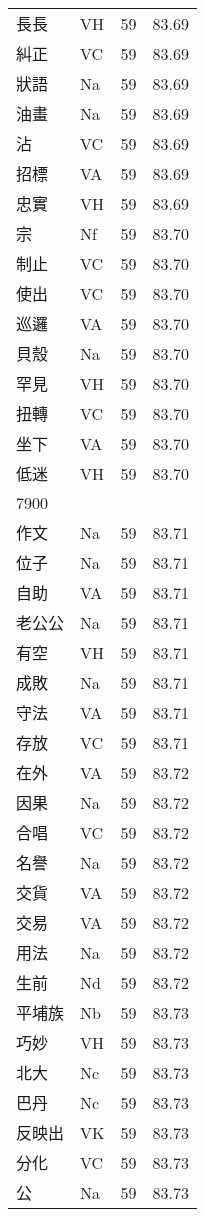\documentclass[twocolumn]{book}
\begin{document}
\begin{supertabular}{llrr}
長長 & VH & 59 &  83.69\\
糾正 & VC & 59 &  83.69\\
狀語 & Na & 59 &  83.69\\
油畫 & Na & 59 &  83.69\\
沾 & VC & 59 &  83.69\\
招標 & VA & 59 &  83.69\\
忠實 & VH & 59 &  83.69\\
宗 & Nf & 59 &  83.70\\
制止 & VC & 59 &  83.70\\
使出 & VC & 59 &  83.70\\
巡邏 & VA & 59 &  83.70\\
貝殼 & Na & 59 &  83.70\\
罕見 & VH & 59 &  83.70\\
扭轉 & VC & 59 &  83.70\\
坐下 & VA & 59 &  83.70\\
低迷 & VH & 59 &  83.70\\
7900\\
作文 & Na & 59 &  83.71\\
位子 & Na & 59 &  83.71\\
自助 & VA & 59 &  83.71\\
老公公 & Na & 59 &  83.71\\
有空 & VH & 59 &  83.71\\
成敗 & Na & 59 &  83.71\\
守法 & VA & 59 &  83.71\\
存放 & VC & 59 &  83.71\\
在外 & VA & 59 &  83.72\\
因果 & Na & 59 &  83.72\\
合唱 & VC & 59 &  83.72\\
名譽 & Na & 59 &  83.72\\
交貨 & VA & 59 &  83.72\\
交易 & VA & 59 &  83.72\\
用法 & Na & 59 &  83.72\\
生前 & Nd & 59 &  83.72\\
平埔族 & Nb & 59 &  83.73\\
巧妙 & VH & 59 &  83.73\\
北大 & Nc & 59 &  83.73\\
巴丹 & Nc & 59 &  83.73\\
反映出 & VK & 59 &  83.73\\
分化 & VC & 59 &  83.73\\
公 & Na & 59 &  83.73\\

\end{supertabular}
\end{document}
